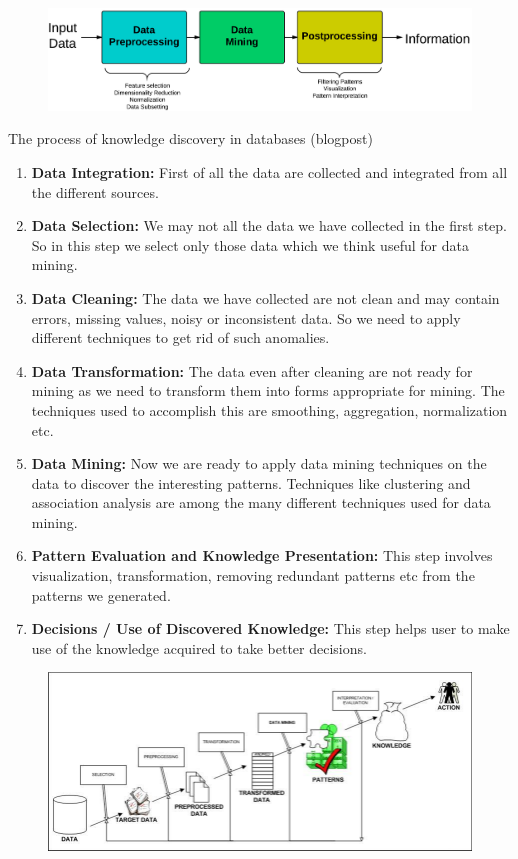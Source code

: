 		\begin{figure}[H]
			\includegraphics[width=\textwidth]{pics/KDD.png}
		\end{figure}

	\clearpage
	The process of knowledge discovery in databases (blogpost)
		
	\begin{enumerate}
		\item {\bf Data Integration:} First of all the data are collected and integrated from all the 
		different sources.
		\item {\bf Data Selection:} We may not all the data we have collected in the first step. So in this 
		step we select only those data which we think useful for data mining.
		\item {\bf Data Cleaning:} The data we have collected are not clean and may contain errors, missing values,
		noisy or inconsistent data. So we need to apply different techniques to get rid of such anomalies.
		\item {\bf Data Transformation:} The data even after cleaning are not ready for mining as we need to 
		transform them into forms appropriate for mining. The techniques used to accomplish this are smoothing,
		aggregation, normalization etc.
		\item {\bf Data Mining:} Now we are ready to apply data mining techniques on the data to discover the 
		interesting patterns. Techniques like clustering and association analysis are among the many different
		techniques used for data mining.
		\item {\bf Pattern Evaluation and Knowledge Presentation:} This step involves visualization, 
		transformation, removing redundant patterns etc from the patterns we generated.
		\item {\bf Decisions / Use of Discovered Knowledge:} This step helps user to make use of the knowledge acquired to take better decisions.
	\end{enumerate}

		\begin{figure}[H]
			\includegraphics[width=\textwidth]{pics/datamining.jpg}
		\end{figure}

